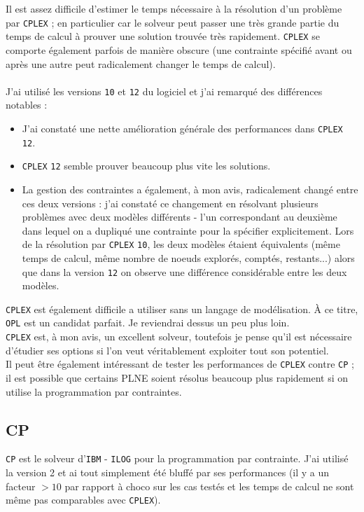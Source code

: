 Il est assez difficile d'estimer le temps nécessaire à la résolution d'un problème par \verb?CPLEX? ;
en particulier car le solveur peut passer une très grande partie du temps de calcul à prouver une solution
trouvée très rapidement.
\verb?CPLEX? se comporte également parfois de manière obscure (une contrainte spécifié avant ou après une autre peut
radicalement changer le temps de calcul).\\\\
J'ai utilisé les versions \verb?10? et \verb?12? du logiciel et j'ai remarqué des différences notables :
\begin{itemize}
 \item J'ai constaté une nette amélioration générale des performances dans \verb?CPLEX? \verb?12?.
 \item \verb?CPLEX? \verb?12? semble prouver beaucoup plus vite les solutions.
 \item La gestion des contraintes a également, à mon avis, radicalement changé entre ces deux versions :
    j'ai constaté ce changement en résolvant plusieurs problèmes avec deux modèles différents - l'un
    correspondant au deuxième dans lequel on a dupliqué une contrainte pour la spécifier explicitement.
    Lors de la résolution par \verb?CPLEX? \verb?10?, les deux modèles étaient équivalents (même temps de calcul,
    même nombre de noeuds explorés, comptés, restants...) alors que dans la version \verb?12? on observe une différence considérable
    entre les deux modèles.
\end{itemize}

\verb?CPLEX? est également difficile a utiliser sans un langage de modélisation. À ce titre, \verb?OPL?
est un candidat parfait. Je reviendrai dessus un peu plus loin.\\

\verb?CPLEX? est, à mon avis, un excellent solveur, toutefois je pense qu'il est nécessaire
d'étudier ses options si l'on veut véritablement exploiter tout son potentiel.\\
Il peut être également intéressant de tester les performances de \verb?CPLEX? contre \verb?CP? ;
il est possible que certains PLNE soient résolus beaucoup plus rapidement
si on utilise la programmation par contraintes.

\subsection{CP}
\verb?CP? est le solveur d'\verb?IBM? - \verb?ILOG? pour la programmation par contrainte.
J'ai utilisé la version 2 et ai tout simplement été bluffé par ses performances (il y a un
facteur $> 10$ par rapport à choco sur les cas testés et les temps de calcul ne sont même
pas comparables avec \verb?CPLEX?).\\

